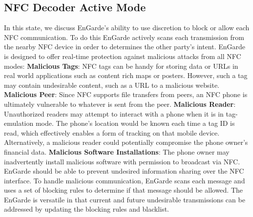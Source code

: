 \documentclass{sig-alternate}
\begin{document}
\subsection{NFC Decoder Active Mode}
In this state, we discuss EnGarde's ability to use discretion to block or allow each NFC communication. To do this EnGarde actively scans each transmission from the nearby NFC device in order to determines the other party's intent. EnGarde is designed to offer real-time protection against malicious attacks from all NFC modes:
\vspace{2mm}\newline
\noindent\textbf{Malicious Tags}: NFC tags can be handy for storing data or URLs in real world applications such as content rich maps or posters. However, such a tag may contain undesirable content, such as a URL to a malicious website. 
\vspace{2mm}\newline
\noindent\textbf{Malicious Peer}: Since NFC supports file transfers from peers, an NFC phone is ultimately vulnerable to whatever is sent from the peer.
\vspace{2mm}\newline
\noindent\textbf{Malicious Reader}: Unauthorized readers may attempt to interact with a phone when it is in tag-emulation mode. The phone's location would be known each time a tag ID is read, which effectively enables a form of tracking on that mobile device. Alternatively, a malicious reader could potentially compromise the phone owner's financial data.
\vspace{2mm}\newline
\noindent\textbf{Malicious Software Installations}: The phone owner may inadvertently install malicious software with permission to broadcast via NFC. EnGarde should be able to prevent undesired information sharing over the NFC interface.
\vspace{2mm}\newline
To handle malicious communication, EnGarde scans each message and uses a set of blocking rules to determine if that message should be allowed. The EnGarde is versatile in that current and future undesirable transmissions can be addressed by updating the blocking rules and blacklist.
\end{document}
